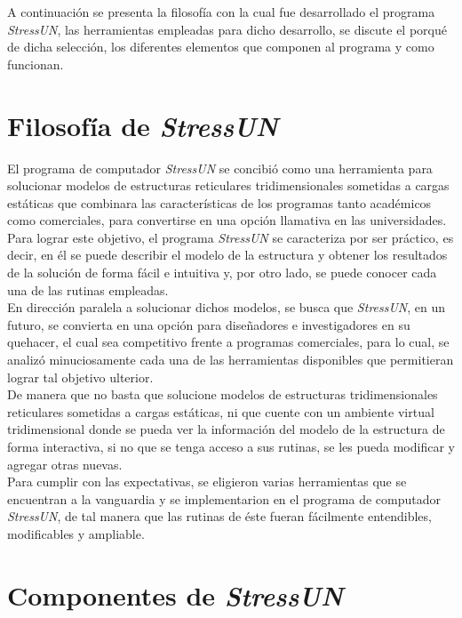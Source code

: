 A continuación se presenta la filosofía con la cual fue desarrollado el programa \textit{StressUN}, las herramientas empleadas para dicho desarrollo, se discute el porqué de dicha selección, los diferentes elementos que componen al programa y como funcionan.

\section{Filosofía de \textit{StressUN}}

El programa de computador \textit{StressUN} se concibió como una herramienta para solucionar modelos de estructuras reticulares tridimensionales sometidas a cargas estáticas que combinara las características de los programas tanto académicos como comerciales, para convertirse en una opción llamativa en las universidades. \\

Para lograr este objetivo, el programa \textit{StressUN} se caracteriza por ser práctico, es decir, en él se puede describir el modelo de la estructura y obtener los resultados de la solución de forma fácil e intuitiva y, por otro lado, se puede conocer cada una de las rutinas empleadas. \\

En dirección paralela a solucionar dichos modelos, se busca que \textit{StressUN}, en un futuro, se convierta en una opción para diseñadores e investigadores en su quehacer, el cual sea competitivo frente a programas comerciales, para lo cual, se analizó minuciosamente cada una de las herramientas disponibles que permitieran lograr tal objetivo ulterior. \\

De manera que no basta que solucione modelos de estructuras tridimensionales reticulares sometidas a cargas estáticas, ni que cuente con un ambiente virtual tridimensional donde se pueda ver la información del modelo de la estructura de forma interactiva, si no que se tenga acceso a sus rutinas, se les pueda modificar y agregar otras nuevas. \\

Para cumplir con las expectativas, se eligieron varias herramientas que se encuentran a la vanguardia y se implementarion en el programa de computador \textit{StressUN}, de tal manera que las rutinas de éste fueran fácilmente entendibles, modificables y ampliable.

\section{Componentes de \textit{StressUN}}

